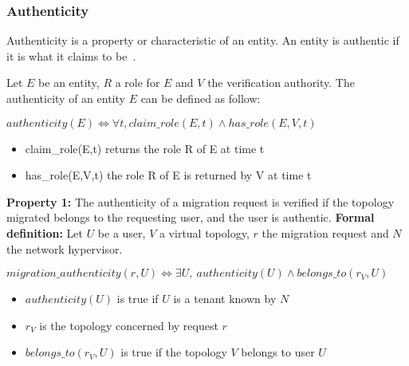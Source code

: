 \subsubsection{Authenticity}
\label{sec:prop-auth}
Authenticity is a property or characteristic of an entity.
An entity is authentic if it is what it claims to be~\cite{ISO/IEC270012013}.

Let $E$ be an entity, $R$ a role for $E$ and $V$ the verification authority.
The authenticity of an entity $E$ can be defined as follow:

\begin{myformula}
$ authenticity(E) \Leftrightarrow \forall t, claim\_role(E,t) \wedge has\_role(E,V,t)$
\end{myformula}
\begin{itemize}
\item claim\_role(E,t) returns the role R of E at time t
\item has\_role(E,V,t) the role R of E is returned by V at time t
\end{itemize}

\textbf{Property 1:} The authenticity of a migration request is verified if the topology migrated belongs to the requesting user, and the user is authentic.
\newline
\textbf{Formal definition: } Let $U$ be a user, $V$ a virtual topology, $r$ the migration request and $N$ the network hypervisor.

\begin{myformula}
$migration\_authenticity(r,U) \Leftrightarrow \exists U,~authenticity(U) \wedge belongs\_to(r_V,U)$
\end{myformula}
\begin{itemize}
\item $authenticity(U)$ is true if $U$ is a tenant known by $N$
\item $r_V$ is the topology concerned by request $r$
\item $belongs\_to(r_V,U)$ is true if the topology $V$ belongs to user $U$
\end{itemize}


